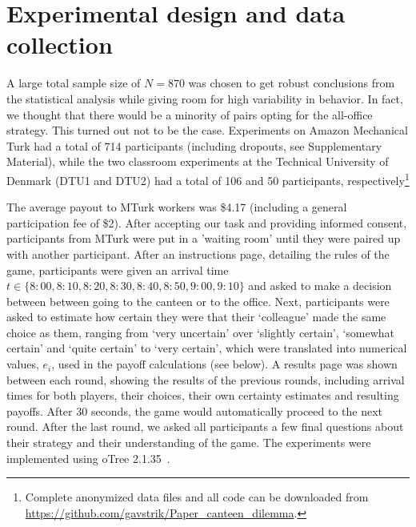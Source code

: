 \documentclass[twocolumn,a4paper,superscriptaddress,nofootinbib]{revtex4}
\newcommand{\tobo}[1]{{\color{red} TOBO: #1}}
\newcommand{\tsn}[1]{{\color{blue} TSN: #1}}
\begin{document}


\section{Experimental design and data collection} A large total sample size of $N=870$ was chosen to get robust conclusions from the statistical analysis while giving room for high variability in behavior. In fact, we thought that there would be a minority of pairs
opting for the all-office strategy. This turned out not to be the case. Experiments on Amazon Mechanical Turk had a total of 714 participants (including dropouts, see Supplementary Material), while the two classroom experiments at the Technical University of Denmark (DTU1 and DTU2) had a total of 106 and 50 participants, respectively\footnote{Complete anonymized data files and all code can be downloaded from \url{https://github.com/gavstrik/Paper_canteen_dilemma}.}

The average payout to MTurk workers was \$4.17 (including a general participation fee of \$2). After accepting our task and providing informed consent, participants from MTurk were put in a ’waiting room’ until they were paired up with another participant. After an instructions page, detailing the rules of the game, participants were given an arrival time $t \in \{8{:}00, 8{:}10, 8{:}20, 8{:}30, 8{:}40, 8{:}50, 9{:}00,9{:}10\}$ and asked to make a decision between between going to the canteen or to the office. Next, participants were asked to estimate how certain they were that their `colleague' made the same choice as them, ranging from `very uncertain' over `slightly certain', `somewhat certain' and `quite certain' to `very certain', which were translated  into numerical values, $e_i$, used in the payoff calculations (see below). A results page was shown between each round, showing the results of the previous rounds, including arrival times for both players, their choices, their own certainty estimates and resulting payoffs. After 30 seconds, the game would automatically proceed to the next round. After the last round, we asked all participants a few final questions about their strategy and their understanding of the game. The experiments were implemented using oTree 2.1.35~\citep{ChenSchongerWickens16}.
\end{document}
